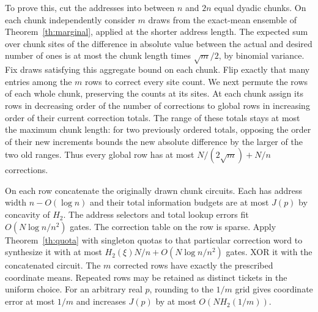 To prove this, cut the addresses into between $n$ and $2n$ equal dyadic chunks. On each chunk independently consider $m$ draws from the exact-mean ensemble of Theorem~\ref{th:marginal}, applied at the shorter address length. The expected sum over chunk sites of the difference in absolute value between the actual and desired number of ones is at most the chunk length times $\sqrt m/2$, by binomial variance. Fix draws satisfying this aggregate bound on each chunk. Flip exactly that many entries among the $m$ rows to correct every site count. We next permute the rows of each whole chunk, preserving the counts at its sites. At each chunk assign its rows in decreasing order of the number of corrections to global rows in increasing order of their current correction totals. The range of these totals stays at most the maximum chunk length: for two previously ordered totals, opposing the order of their new increments bounds the new absolute difference by the larger of the two old ranges. Thus every global row has at most $N/(2\sqrt m)+N/n$ corrections.

On each row concatenate the originally drawn chunk circuits. Each has address width $n-O(\log n)$ and their total information budgets are at most $J(p)$ by concavity of $H_2$. The address selectors and total lookup errors fit $O(N\log n/n^2)$ gates. The correction table on the row is sparse. Apply Theorem~\ref{th:quota} with singleton quotas to that particular correction word to synthesize it with at most $H_2(\xi)N/n+O(N\log n/n^2)$ gates. XOR it with the concatenated circuit. The $m$ corrected rows have exactly the prescribed coordinate means. Repeated rows may be retained as distinct tickets in the uniform choice. For an arbitrary real $p$, rounding to the $1/m$ grid gives coordinate error at most $1/m$ and increases $J(p)$ by at most $O(NH_2(1/m))$.
